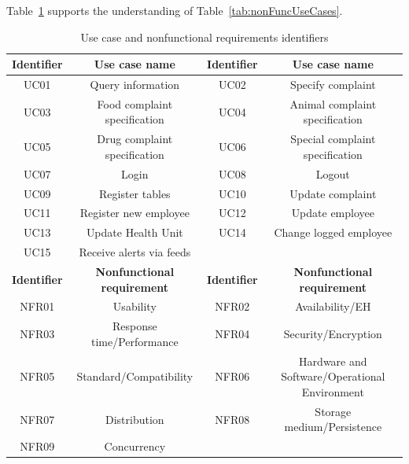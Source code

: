 \documentclass[11pt,twoside]{article}
\begin{document}
Table~\ref{tab:identifiers} supports the understanding of Table~\ref{tab:nonFuncUseCases}.
\begin{table}[!htb]

\begin{center}
\begin{footnotesize}
\begin{tabular}{c|c||c|c} \hline
\textbf{Identifier}& \textbf{Use case name} & \textbf{Identifier} & \textbf{Use case name}\\ \hline
UC01 & Query information & UC02 & Specify complaint \\ \hline
UC03 & Food complaint specification & UC04 & Animal complaint specification \\ \hline
UC05 & Drug complaint specification & UC06 & Special complaint specification \\ \hline
UC07 & Login & UC08 & Logout \\ \hline 
UC09 & Register tables  & UC10 & Update complaint \\ \hline 
UC11 & Register new employee & UC12 & Update employee \\ \hline 
UC13 & Update Health Unit & UC14 & Change logged employee \\ \hline 
UC15 & Receive alerts via feeds & & \\ \hline \hline
\textbf{Identifier} & \textbf{Nonfunctional requirement} & \textbf{Identifier} & \textbf{Nonfunctional requirement} \\ \hline
NFR01      & Usability                  & NFR02      & Availability/EH \\ \hline
NFR03      & Response time/Performance  & NFR04      & Security/Encryption \\ \hline
NFR05      & Standard/Compatibility     & NFR06      & Hardware and Software/Operational Environment \\ \hline
NFR07      & Distribution               & NFR08      & Storage medium/Persistence\\ \hline
NFR09      & Concurrency & &\\ \hline
\end{tabular}
\end{footnotesize}
\end{center}
\caption{Use case and nonfunctional requirements identifiers} 
\label{tab:identifiers}
\end{table}
\end{document}
